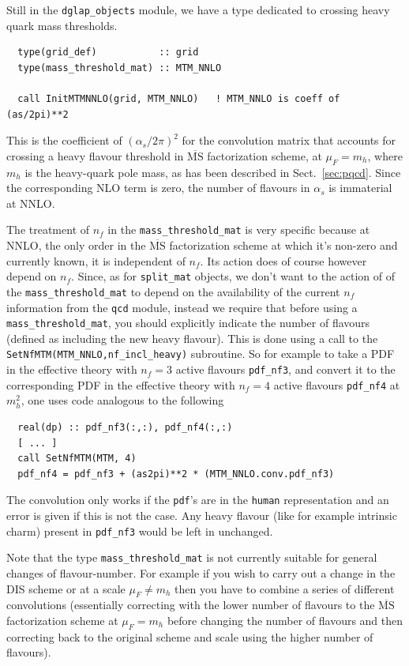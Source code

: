 \documentclass[12pt]{article}
\newcommand{\as}{\alpha_s}
\newcommand{\MSbar}{\overline{\mathrm{MS}}}
\newcommand{\ttt}[1]{\texttt{#1}}
\begin{document}
Still in the \ttt{dglap\_objects} module, we have a type dedicated to
crossing heavy quark mass thresholds.
\begin{lstlisting}
  type(grid_def)           :: grid
  type(mass_threshold_mat) :: MTM_NNLO

  call InitMTMNNLO(grid, MTM_NNLO)   ! MTM_NNLO is coeff of (as/2pi)**2
\end{lstlisting}
This is the coefficient  of $(\as/2\pi)^2$ for the convolution matrix that
accounts for crossing a heavy flavour threshold in $\MSbar$
factorization scheme, at $\mu_F = m_h$, where
$m_h$ is the heavy-quark pole mass, as has
been described in Sect.~\ref{sec:pqcd}. Since the
corresponding NLO term is zero, the number of flavours in $\as$ is
immaterial at NNLO. 

The treatment of $n_f$ in the \ttt{mass\_threshold\_mat} is very
specific because at NNLO, the only order in the $\MSbar$ factorization
scheme at which it's non-zero and currently known, it is independent of $n_f$.
Its action does of course however depend on $n_f$. Since, as for
\ttt{split\_mat} objects, we don't want to the action of of the
\ttt{mass\_threshold\_mat} to depend on the availability of the
current $n_f$ information from the \ttt{qcd} module, instead we
require that before using a \ttt{mass\_threshold\_mat}, you should
explicitly indicate the number of flavours (defined as including the
new heavy flavour). This is done using a call to the
\ttt{SetNfMTM(MTM\_NNLO,nf\_incl\_heavy)} subroutine. So for example
to take a PDF in the effective theory with
$n_f=3$ active flavours \ttt{pdf\_nf3}, and convert it
to the corresponding PDF in the effective theory with
$n_f=4$ active flavours \ttt{pdf\_nf4} at $m_h^2$, one
uses code analogous to the following
\begin{lstlisting}
  real(dp) :: pdf_nf3(:,:), pdf_nf4(:,:)
  [ ... ]
  call SetNfMTM(MTM, 4)
  pdf_nf4 = pdf_nf3 + (as2pi)**2 * (MTM_NNLO.conv.pdf_nf3)
\end{lstlisting}
The convolution only works if the \ttt{pdf}'s are in the \ttt{human}
representation and an error is given if this is not the case. Any
heavy flavour (like for example intrinsic charm) 
present in \ttt{pdf\_nf3} would be left in unchanged.

Note that the type {\tt mass\_threshold\_mat}
is not currently suitable for general changes of
flavour-number. For example if you wish to carry out a change in the
DIS scheme or at a scale $\mu_F \neq m_h$ then you have
to combine a series of different convolutions (essentially correcting
with the lower number of flavours to the $\MSbar$ factorization scheme
at $\mu_F = m_h$ before changing the number of flavours
and then correcting back to the original scheme and scale using the
higher number of flavours).
\end{document}
